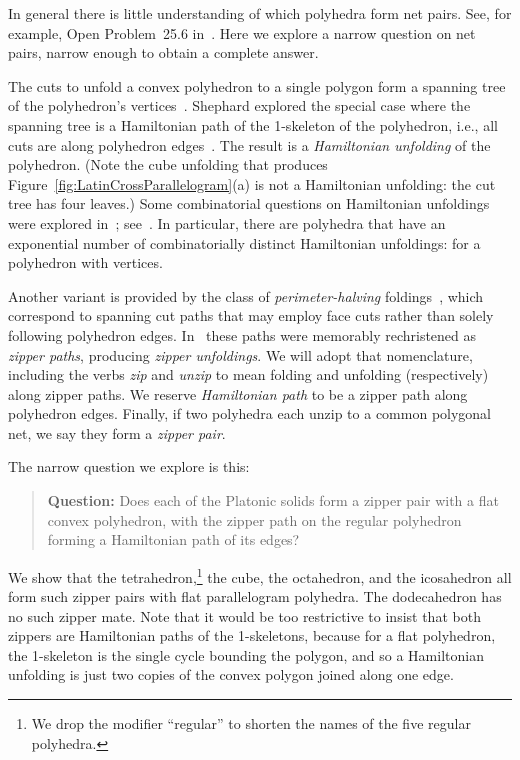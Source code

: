 \pdfoutput=1  \documentclass[]{article}
\newcommand{\figref}[1]{\ref{fig:#1}}
\begin{document}
In general there is little understanding of which polyhedra form net
pairs.
See, for example, Open Problem~25.6 in~\cite{do-gfalop-07}.
Here we explore a narrow question on net pairs,
narrow enough to obtain a complete answer.


The cuts to unfold a convex polyhedron to a single polygon
form a spanning tree of the polyhedron's vertices~\cite[Sec.~22.1.3]{do-gfalop-07}.
Shephard explored the special case where the spanning tree is
a Hamiltonian path of the 1-skeleton of the polyhedron,
i.e., all cuts are along polyhedron edges~\cite{s-cpcn-75}.
The result is a \emph{Hamiltonian unfolding} of the polyhedron.
(Note the cube unfolding that produces
Figure~\figref{LatinCrossParallelogram}(a)
is not a Hamiltonian unfolding: the cut tree has four leaves.)
Some combinatorial questions on Hamiltonian unfoldings were explored in~\cite{ddlo-efupp-02};
see~\cite[Fig.~25.59 ]{do-gfalop-07}.
In particular, there are polyhedra that have an exponential number of
combinatorially distinct Hamiltonian
unfoldings:  for a polyhedron with  vertices.


Another variant is provided by the class of \emph{perimeter-halving} 
foldings~\cite[Sec.~25.1.2 ]{do-gfalop-07},
which correspond to spanning cut paths that may employ face cuts 
rather than solely following polyhedron edges.
In~\cite{lddss-zupc-10} these paths were memorably rechristened as
\emph{zipper paths}, producing \emph{zipper unfoldings}.
We will adopt that nomenclature, including the verbs \emph{zip} and
\emph{unzip}
to mean folding and unfolding (respectively) along zipper paths.
We reserve \emph{Hamiltonian path} to be a zipper path along
polyhedron edges.
Finally, if two polyhedra each unzip to a common polygonal net,
we say they form a \emph{zipper pair}.

The narrow question we explore is this:
\begin{quotation}
\noindent
\textbf{Question:}
Does each of the Platonic solids form a zipper pair
with a flat convex polyhedron,
with the zipper path on the regular polyhedron forming a Hamiltonian
path of its edges?
\end{quotation}

We show that the tetrahedron,\footnote{
    We drop the modifier ``regular'' to shorten the names of the
    five regular polyhedra.
}
the cube, the octahedron, and the
icosahedron all form such zipper pairs with flat parallelogram
polyhedra.
The dodecahedron has no such zipper mate.
Note that it would be too restrictive to insist that both zippers are
Hamiltonian paths of the 1-skeletons, because
for a flat polyhedron, the 1-skeleton is the single cycle bounding
the polygon, and so a Hamiltonian unfolding is just two 
copies of the convex polygon joined along one edge.
\end{document}
